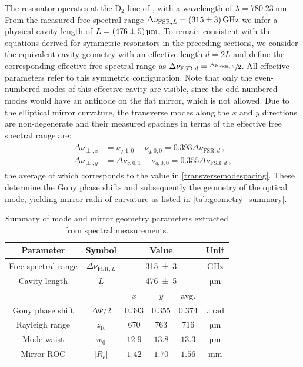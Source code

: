 \documentclass[../Thesis-IJspeert.tex]{subfiles}
\begin{document}
\tikzexternalenable
The resonator operates at the D$_2$ line of , with a wavelength of $\lambda =\SI{780.23}{\nano\metre}$. From the measured free spectral range $\Delta\nu_{\mathrm{FSR},L} = \SI{315\pm3}{\giga\hertz}$ we infer a physical cavity length of $L = \SI{476\pm5}{\micro\metre}$. To remain consistent with the equations derived for symmetric resonators in the preceding sections, we consider the equivalent cavity geometry with an effective length $d = 2L$ and define the corresponding effective free spectral range as $\Delta\nu_{\mathrm{FSR},d} = \sfrac{\Delta\nu_{\mathrm{FSR},L}}{2}$. All effective parameters refer to this symmetric configuration. Note that only the even-numbered modes of this effective cavity are visible, since the odd-numbered modes would have an antinode on the flat mirror, which is not allowed. Due to the elliptical mirror curvature, the transverse modes along the $x$ and $y$ directions are non-degenerate and their measured spacings in terms of the effective free spectral range are:
\begin{align}
\begin{split}
\Delta\nu_{\perp,x} &= \nu_{q,1,0}- \nu_{q,0,0} = 0.393 \Delta\nu_{\mathrm{FSR},d} \,,\\
\Delta\nu_{\perp,y} &=\Delta\nu_{q,0,1} - \nu_{q,0,0} = 0.355 \Delta\nu_{\mathrm{FSR},d}\,,
\end{split}
\end{align}
the average of which corresponds to the value in \autoref{transversemodespacing}. These determine the Gouy phase shifts and subsequently the geometry of the optical mode, yielding mirror radii of curvature as listed in \autoref{tab:geometry_summary}.
\begin{table}[t]
	\centering
	\begin{tabular}{cccccc}  
		\toprule
		Parameter & Symbol & \multicolumn{3}{c}{Value} & Unit \\
		\midrule
		Free spectral range & $\Delta\nu_{\mathrm{FSR},L}$ & \multicolumn{3}{c}{\num{315\pm3}} & $\si{\giga\hertz}$ \\
		Cavity length & $L$ & \multicolumn{3}{c}{\num{476\pm5}} & $\si{\micro\metre}$ \\
		\midrule
		 &  & $x$ & $y$ & avg. &  \\
		 \midrule
		Gouy phase shift & $\Delta\Psi/2$ & $\num{0.393}$ & $\num{0.355}$ & $\num{0.374}$ & $\pi\,\si{\radian}$ \\
		Rayleigh range & $z_\mathrm{R}$ & $\num{670}$ & $\num{763}$ & $\num{716}$ &$\si{\micro\metre}$ \\
		Mode waist & $w_0$ & $\num{12.9}$ & $\num{13.8}$ & $\num{13.3}$ &$\si{\micro\metre}$ \\
		Mirror ROC & $\lvert R_\mathrm{c}\rvert$ & $\num{1.42}$ & $\num{1.70}$ & $\num{1.56}$ &$\si{\milli\metre}$ \\
		\bottomrule
	\end{tabular}
	\caption[Summary of mode and mirror geometry parameters extracted from spectral measurements]{Summary of mode and mirror geometry parameters extracted from spectral measurements.}
	\label{tab:geometry_summary}   
\end{table}
\end{document}
